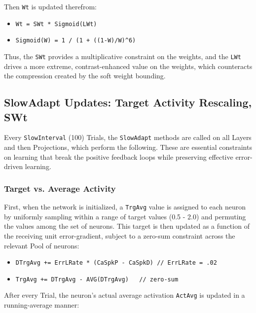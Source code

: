 \documentclass[11pt,twoside]{article}
\newif\myifpdf
\begin{document}
Then \texttt{Wt} is updated therefrom:

\begin{itemize}
\tightlist
\item
  \texttt{Wt\ =\ SWt\ *\ Sigmoid(LWt)}
\item
  \texttt{Sigmoid(W)\ =\ 1\ /\ (1\ +\ ((1-W)/W)\^{}6)}
\end{itemize}

Thus, the \texttt{SWt} provides a multiplicative constraint on the
weights, and the \texttt{LWt} drives a more extreme, contrast-enhanced
value on the weights, which counteracts the compression created by the
soft weight bounding.

\hypertarget{slowadapt-updates-target-activity-rescaling-swt}{%
\subsection{SlowAdapt Updates: Target Activity Rescaling,
SWt}\label{slowadapt-updates-target-activity-rescaling-swt}}

Every \texttt{SlowInterval} (100) Trials, the \texttt{SlowAdapt} methods
are called on all Layers and then Projections, which perform the
following. These are essential constraints on learning that break the
positive feedback loops while preserving effective error-driven
learning.

\hypertarget{target-vs-average-activity}{%
\subsubsection{Target vs. Average
Activity}\label{target-vs-average-activity}}

First, when the network is initialized, a \texttt{TrgAvg} value is
assigned to each neuron by uniformly sampling within a range of target
values (0.5 - 2.0) and permuting the values among the set of neurons.
This target is then updated as a function of the receiving unit
error-gradient, subject to a zero-sum constraint across the relevant
Pool of neurons:

\begin{itemize}
\tightlist
\item
  \texttt{DTrgAvg\ +=\ ErrLRate\ *\ (CaSpkP\ -\ CaSpkD)\ //\ ErrLRate\ =\ .02}
\item
  \texttt{TrgAvg\ +=\ DTrgAvg\ -\ AVG(DTrgAvg)\ \ \ //\ zero-sum}
\end{itemize}

After every Trial, the neuron's actual average activation
\texttt{ActAvg} is updated in a running-average manner:
\end{document}
